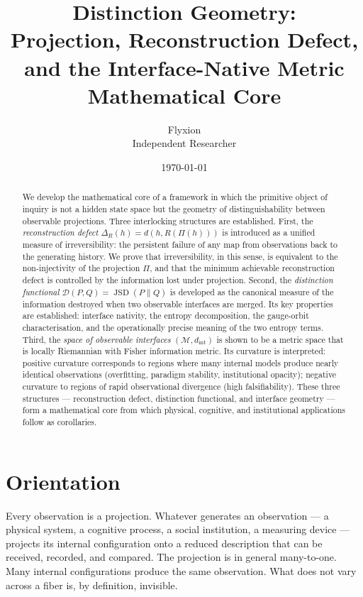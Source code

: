 \documentclass[12pt,a4paper]{article}
\title{\textbf{Distinction Geometry:\\
Projection, Reconstruction Defect,\\
and the Interface-Native Metric}\\[0.5em]
\large Mathematical Core}
\author{Flyxion\\[0.4em]
\small Independent Researcher}
\date{\today}
\theoremstyle{remark}
\theoremstyle{definition}
\begin{document}
\maketitle

\begin{abstract}
We develop the mathematical core of a framework in which the primitive
object of inquiry is not a hidden state space but the geometry of
distinguishability between observable projections. Three interlocking
structures are established. First, the \emph{reconstruction defect}
$\Delta_R(h) = d(h, R(\Pi(h)))$ is introduced as a unified measure of
irreversibility: the persistent failure of any map from observations back
to the generating history. We prove that irreversibility, in this sense,
is equivalent to the non-injectivity of the projection $\Pi$, and that
the minimum achievable reconstruction defect is controlled by the
information lost under projection. Second, the \emph{distinction
functional} $\mathcal{D}(P,Q) = \operatorname{JSD}(P \| Q)$ is developed
as the canonical measure of the information destroyed when two observable
interfaces are merged. Its key properties are established: interface
nativity, the entropy decomposition, the gauge-orbit characterisation,
and the operationally precise meaning of the two entropy terms. Third,
the \emph{space of observable interfaces} $(\mathcal{M}, d_{\mathrm{int}})$
is shown to be a metric space that is locally Riemannian with Fisher
information metric. Its curvature is interpreted: positive curvature
corresponds to regions where many internal models produce nearly identical
observations (overfitting, paradigm stability, institutional opacity);
negative curvature to regions of rapid observational divergence (high
falsifiability). These three structures --- reconstruction defect,
distinction functional, and interface geometry --- form a mathematical
core from which physical, cognitive, and institutional applications
follow as corollaries.
\end{abstract}

\tableofcontents
\newpage

\section*{Orientation}

Every observation is a projection. Whatever generates an observation ---
a physical system, a cognitive process, a social institution, a measuring
device --- projects its internal configuration onto a reduced description
that can be received, recorded, and compared. The projection is in general
many-to-one. Many internal configurations produce the same observation.
What does not vary across a fiber is, by definition, invisible.
\end{document}
